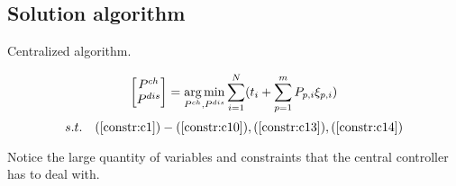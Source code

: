 \subsection{Solution algorithm}
\begin{algorithm}[H]
    \caption{Centralized algorithm.}
    \label{algo:cen}

    
    \BlankLine
    \vspace*{-0.4cm}
    $$\begin{bmatrix}
            P^{ch}\\
            P^{dis} 
        \end{bmatrix}
        = \operatorname*{arg\,min}_{P^{ch}, P^{dis}} \sum_{i=1}^{N} (t_i + \sum_{p=1}^m P_{p,i} \xi_{p,i}) $$
        $$s.t. \quad (\ref{constr:c1})-(\ref{constr:c10}), (\ref{constr:c13}), (\ref{constr:c14})$$
\end{algorithm}
    \noindent Notice the large quantity of variables and constraints that the central controller has to deal with. 